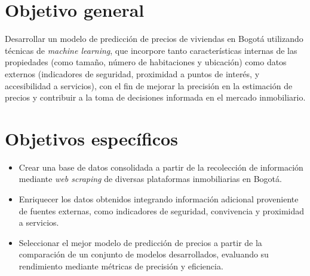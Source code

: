 


\section{Objetivo general}

Desarrollar un modelo de predicción de precios de viviendas en Bogotá utilizando técnicas de \textit{machine learning}, que incorpore tanto características internas de las propiedades (como tamaño, número de habitaciones y ubicación) como datos externos (indicadores de seguridad, proximidad a puntos de interés, y accesibilidad a servicios), con el fin de mejorar la precisión en la estimación de precios y contribuir a la toma de decisiones informada en el mercado inmobiliario.




\section{Objetivos específicos}
\begin{itemize}
    \item Crear una base de datos consolidada a partir de la recolección de información mediante \textit{web scraping} de diversas plataformas inmobiliarias en Bogotá.
    \item Enriquecer los datos obtenidos integrando información adicional proveniente de fuentes externas, como indicadores de seguridad, convivencia y proximidad a servicios.
    \item Seleccionar el mejor modelo de predicción de precios a partir de la comparación de un conjunto de modelos desarrollados, evaluando su rendimiento mediante métricas de precisión y eficiencia.
\end{itemize}

